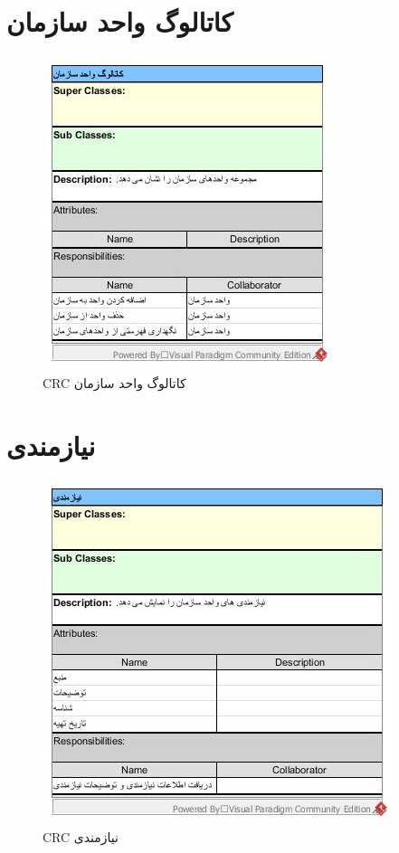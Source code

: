 \section{کاتالوگ واحد سازمان}
\begin{figure}[H]
	\centering
	\includegraphics[scale=1]{img/crc/UnitCatalogue}
	\caption{CRC کاتالوگ واحد سازمان }
\end{figure}

\section{نیازمندی}
\begin{figure}[H]
	\centering
	\includegraphics[scale=1]{img/crc/Requirement}
	\caption{CRC نیازمندی }
\end{figure}

